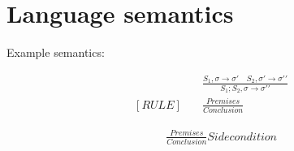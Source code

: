 \section{Language semantics}\label{sec:languagesemantics}

Example semantics:

\begin{align*}
    [COMPOSITION] \quad &
    \frac
    {S_1, \sigma \rightarrow \sigma \prime \quad S_2, \sigma \prime \rightarrow \sigma \prime \prime}
    {S_1;S_2, \sigma \rightarrow \sigma \prime \prime}
    \\
    [RULE]     \quad    &
    \frac
    {Premises}
    {Conclusion}
\end{align*}

\begin{align*}
    [RULE]     \quad &
    \frac
    {Premises}
    {Conclusion}
    Side condition
\end{align*}